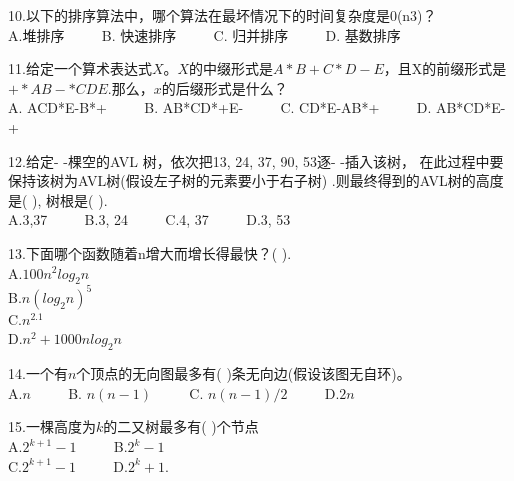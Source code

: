 10.以下的排序算法中，哪个算法在最坏情况下的时间复杂度是0(n3)？ \\
A.堆排序  $\qquad$ B. 快速排序  $\qquad$ C. 归并排序 $\qquad$ D. 基数排序

11.给定一个算术表达式$X$。$X$的中缀形式是$A*B+C*D-E$，且X的前缀形式是$+*AB-*CDE$.那么，$x$的后缀形式是什么？ \\
A. ACD*E-B*+ $\qquad$ B. AB*CD*+E- $\qquad$ C. CD*E-AB*+ $\qquad$ D. AB*CD*E-+

12.给定- -棵空的AVL 树，依次把13, 24, 37, 90, 53逐- -插入该树， 在此过程中要保持该树为AVL树(假设左子树的元素要小于右子树) .则最终得到的AVL树的高度是( ), 树根是( ). \\
A.3,37 $\qquad$ B.3, 24 $\qquad$ C.4, 37 $\qquad$ D.3, 53

13.下面哪个函数随着n增大而增长得最快？( ). \\
A.$100n^2log_2n$ \\
B.$n(log_2n)^5$ \\
C.$n^{2.1}$ \\
D.$n^2+1000nlog_2n$

14.一个有$n$个顶点的无向图最多有( )条无向边(假设该图无自环)。 \\
A.$n$ $\qquad$ B. $n(n-1)$ $\qquad$ C. $n(n-1)/2$ $\qquad$ D.$2n$

15.一棵高度为$k$的二又树最多有( )个节点 \\
A.$2^{k+1}-1$ $\qquad$ B.$2^k-1$ \\
C.$2^{k+1}-1$ $\qquad$ D.$2^k+1$.